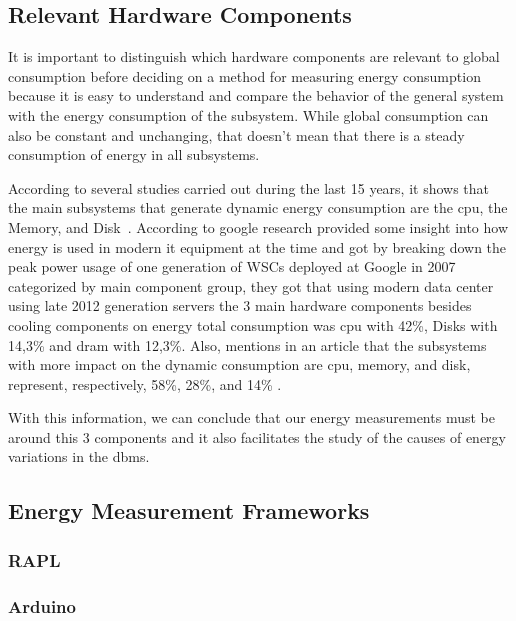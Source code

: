 \subsection{Relevant Hardware Components}
\label{relevant}
It is important to distinguish which hardware components are relevant to global consumption before deciding on a method for measuring energy consumption because it is easy to understand and compare the behavior of the general system with the energy consumption of the subsystem. While global consumption can also be constant and unchanging, that doesn't mean that there is a steady consumption of energy in all subsystems.

According to several studies carried out during the last 15 years, it shows that the main subsystems that generate dynamic energy consumption are the \gls{cpu}, the Memory, and Disk~\cite{portela2016}. According to google research \cite{google} provided some insight into how energy is used in modern \gls{it} equipment at the time and got by breaking down the peak power usage of one generation of WSCs deployed at Google in 2007 categorized by main component group, they got that using modern data center using late 2012 generation servers the 3 main hardware components besides cooling components on energy total consumption was \gls{cpu} with 42\%, Disks with 14,3\% and \gls{dram} with 12,3\%. Also, \citeauthor{kensal} mentions in an article that the subsystems with more impact on the dynamic consumption are \gls{cpu}, memory, and disk, represent, respectively, 58\%, 28\%, and 14\% .

With this information, we can conclude that our energy measurements must be around this 3 components and it also facilitates the study of the causes of energy variations in the \gls{dbms}. 




\subsection{Energy Measurement Frameworks}
\label{energyframe}

\subsubsection{RAPL}
\label{sc:RAPL}


\subsubsection{Arduino}
\label{sc:Arduino}

